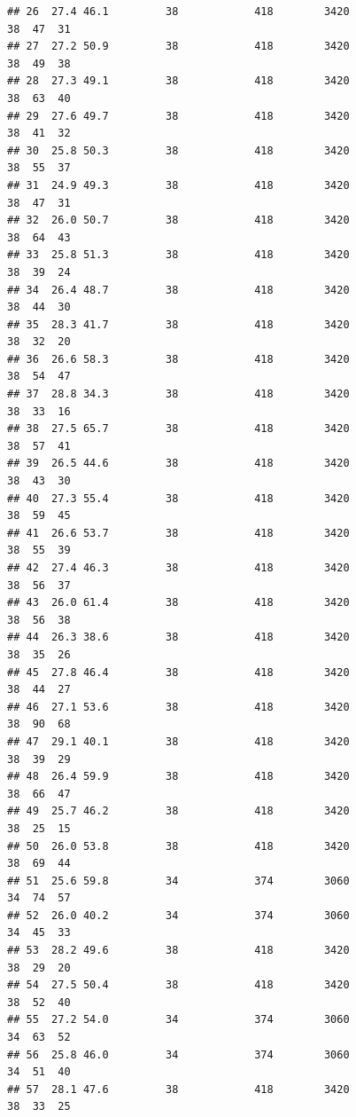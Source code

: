 \documentclass[
]{book}
\theoremstyle{definition}
\theoremstyle{definition}
\theoremstyle{definition}
\theoremstyle{definition}
\theoremstyle{remark}
\begin{document}
\begin{verbatim}
## 26  27.4 46.1         38            418        3420                  38  47  31
## 27  27.2 50.9         38            418        3420                  38  49  38
## 28  27.3 49.1         38            418        3420                  38  63  40
## 29  27.6 49.7         38            418        3420                  38  41  32
## 30  25.8 50.3         38            418        3420                  38  55  37
## 31  24.9 49.3         38            418        3420                  38  47  31
## 32  26.0 50.7         38            418        3420                  38  64  43
## 33  25.8 51.3         38            418        3420                  38  39  24
## 34  26.4 48.7         38            418        3420                  38  44  30
## 35  28.3 41.7         38            418        3420                  38  32  20
## 36  26.6 58.3         38            418        3420                  38  54  47
## 37  28.8 34.3         38            418        3420                  38  33  16
## 38  27.5 65.7         38            418        3420                  38  57  41
## 39  26.5 44.6         38            418        3420                  38  43  30
## 40  27.3 55.4         38            418        3420                  38  59  45
## 41  26.6 53.7         38            418        3420                  38  55  39
## 42  27.4 46.3         38            418        3420                  38  56  37
## 43  26.0 61.4         38            418        3420                  38  56  38
## 44  26.3 38.6         38            418        3420                  38  35  26
## 45  27.8 46.4         38            418        3420                  38  44  27
## 46  27.1 53.6         38            418        3420                  38  90  68
## 47  29.1 40.1         38            418        3420                  38  39  29
## 48  26.4 59.9         38            418        3420                  38  66  47
## 49  25.7 46.2         38            418        3420                  38  25  15
## 50  26.0 53.8         38            418        3420                  38  69  44
## 51  25.6 59.8         34            374        3060                  34  74  57
## 52  26.0 40.2         34            374        3060                  34  45  33
## 53  28.2 49.6         38            418        3420                  38  29  20
## 54  27.5 50.4         38            418        3420                  38  52  40
## 55  27.2 54.0         34            374        3060                  34  63  52
## 56  25.8 46.0         34            374        3060                  34  51  40
## 57  28.1 47.6         38            418        3420                  38  33  25

\end{verbatim}
\end{document}
